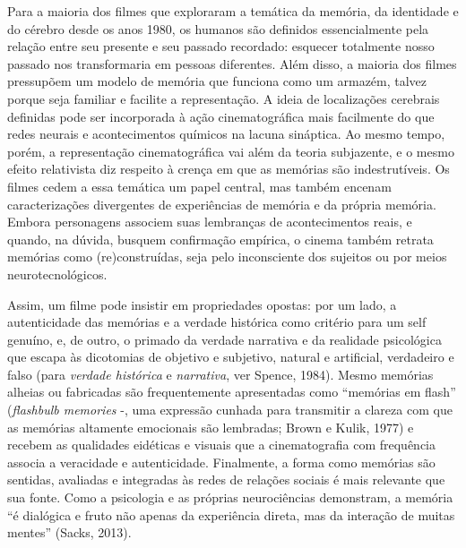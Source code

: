 Para a maioria dos filmes que exploraram a temática da memória, da
identidade e do cérebro desde os anos 1980, os humanos são definidos
essencialmente pela relação entre seu presente e seu passado recordado:
esquecer totalmente nosso passado nos transformaria em pessoas
diferentes. Além disso, a maioria dos filmes pressupõem um modelo de
memória que funciona como um armazém, talvez porque seja familiar e
facilite a representação. A ideia de localizações cerebrais definidas
pode ser incorporada à ação cinematográfica mais facilmente do que redes
neurais e acontecimentos químicos na lacuna sináptica. Ao mesmo tempo,
porém, a representação cinematográfica vai além da teoria subjazente, e
o mesmo efeito relativista diz respeito à crença em que as memórias são
indestrutíveis. Os filmes cedem a essa temática um papel central, mas
também encenam caracterizações divergentes de experiências de memória e
da própria memória. Embora personagens associem suas lembranças de
acontecimentos reais, e quando, na dúvida, busquem confirmação empírica,
o cinema também retrata memórias como (re)construídas, seja pelo
inconsciente dos sujeitos ou por meios neurotecnológicos.

Assim, um filme pode insistir em propriedades opostas: por um lado, a
autenticidade das memórias e a verdade histórica como critério para um
self genuíno, e, de outro, o primado da verdade narrativa e da realidade
psicológica que escapa às dicotomias de objetivo e subjetivo, natural e
artificial, verdadeiro e falso (para \emph{verdade histórica} e
\emph{narrativa}, ver Spence, 1984). Mesmo memórias alheias ou
fabricadas são frequentemente apresentadas como ``memórias em flash''
(\emph{flashbulb memories} -, uma expressão cunhada para transmitir a
clareza com que as memórias altamente emocionais são lembradas; Brown e
Kulik, 1977) e recebem as qualidades eidéticas e visuais que a
cinematografia com frequência associa a veracidade e autenticidade.
Finalmente, a forma como memórias são sentidas, avaliadas e integradas
às redes de relações sociais é mais relevante que sua fonte. Como a
psicologia e as próprias neurociências demonstram, a memória ``é
dialógica e fruto não apenas da experiência direta, mas da interação de
muitas mentes'' (Sacks, 2013).

